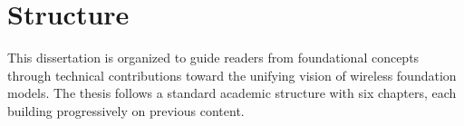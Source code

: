 \section{Structure}
\label{sec:structure}

This dissertation is organized to guide readers from foundational concepts through technical contributions toward the unifying vision of wireless foundation models. The thesis follows a standard academic structure with six chapters, each building progressively on previous content.

\begin{itemize}




\end{itemize}
